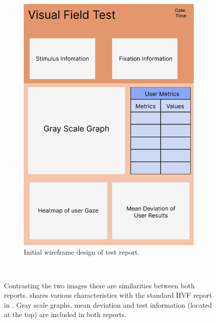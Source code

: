 \documentclass{l4proj}
\begin{document}
\begin{figure}[htbp]
\begin{subfigure}[b]{0.49\textwidth}
        \includegraphics[width=\textwidth]{dissertation/images/Report_Wireframe.png}
        \caption{Initial wireframe design of test report.}
        \label{fig:REPORT_WIREFRAME}
    \end{subfigure}
    ~  
    \caption{Contrasting the two images there are similarities between both reports.  shares various characteristics with the standard HVF report in . Gray scale graphs, mean deviation and test information (located at the top) are included in both reports.}\label{fig:HVF_Report_Wireframe}
\end{figure}
\end{document}
